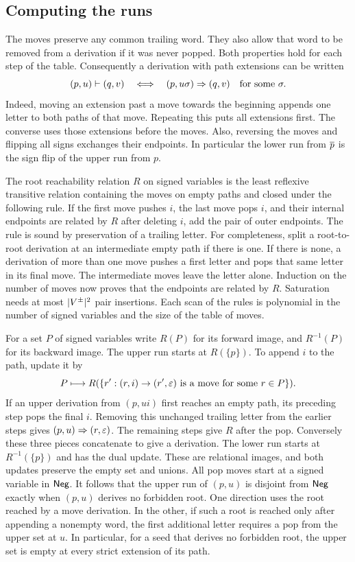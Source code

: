 \subsection{Computing the runs}

The moves preserve any common trailing word. They also allow that
word to be removed from a derivation if it was never popped. Both
properties hold for each step of the table. Consequently a derivation
with path extensions can be written
\[
       (p,u)\vdash(q,v)
       \quad\Longleftrightarrow\quad
       (p,u\sigma)\Rightarrow(q,v)\quad\text{for some }\sigma .
\]
Indeed, moving an extension past a move towards the beginning appends
one letter to both paths of that move. Repeating this puts all
extensions first. The converse uses those extensions before the moves.
Also, reversing the moves and flipping all signs exchanges their
endpoints. In particular the lower run from $\overline{p}$ is the sign
flip of the upper run from $p$.

The root reachability relation $R$ on signed variables is the least
reflexive transitive relation containing the moves on empty paths and
closed under the following rule. If the first move pushes $i$, the last
move pops $i$, and their internal endpoints are related by $R$ after
deleting $i$, add the pair of outer endpoints. The rule is sound by
preservation of a trailing letter. For completeness, split a
root-to-root derivation at an intermediate empty path if there is one.
If there is none, a derivation of more than one move pushes a first
letter and pops that same letter in its final move. The intermediate
moves leave the letter alone. Induction on the number of moves now
proves that the endpoints are related by $R$. Saturation needs at
most $|V^{\pm}|^2$ pair insertions. Each scan of the rules is polynomial
in the number of signed variables and the size of the table of moves.

For a set $P$ of signed variables write $R(P)$ for its forward image,
and $R^{-1}(P)$ for its backward image. The upper run starts at
$R(\{p\})$. To append $i$ to the path, update it by
\[
 P\longmapsto R(\{r':(r,i)\to(r',\varepsilon)\text{ is a move for some }r\in P\}).
\]
If an upper derivation from $(p,ui)$ first reaches an empty path, its
preceding step pops the final $i$. Removing this unchanged trailing
letter from the earlier steps gives $(p,u)\Rightarrow(r,\varepsilon)$. The remaining
steps give $R$ after the pop. Conversely these three pieces concatenate
to give a derivation. The lower run starts at $R^{-1}(\{p\})$ and has
the dual update. These are relational images, and both updates
preserve the empty set and unions. All pop moves start at a signed
variable in $\mathsf{Neg}$. It follows that the upper run of $(p,u)$ is
disjoint from $\mathsf{Neg}$ exactly when $(p,u)$ derives no forbidden root.
One direction uses the root reached by a move derivation. In the other,
if such a root is reached only after appending a nonempty word, the
first additional letter requires a pop from the upper set at $u$.
In particular, for a seed that derives no forbidden root, the upper
set is empty at every strict extension of its path.

